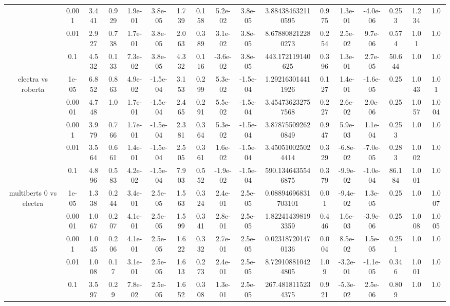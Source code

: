 \begin{tabular}{|c|c|c|c|c|c|c|c|c|c|c|c|c|c|c|c|c|}
 & 0.001 & 3.441 & 0.929 & 1.9e-01 & 3.8e-05 & 1.739 & 0.158 & 5.2e-02 & 3.8e-05 & 3.884384632110595 & 0.975 & 1.3e-01 & -4.0e-06 & 0.253 & 1.234 & 1.0 \\
 & 0.01 & 2.927 & 0.738 & 1.7e-01 & 3.8e-05 & 2.063 & 0.389 & 3.1e-02 & 3.8e-05 & 8.678808212280273 & 0.254 & 2.5e-02 & 9.7e-06 & 0.574 & 1.01 & 1.0 \\
 & 0.1 & 4.532 & 0.133 & 7.3e-02 & 3.8e-05 & 4.332 & 0.116 & -3.6e-02 & 3.8e-05 & 443.172119140625 & 0.396 & 1.3e-01 & 2.7e-05 & 50.644 & 1.0 & 1.0 \\
\hline
\multirow{5}{*}{electra  vs roberta } & 1e-05 & 6.852 & 0.863 & 4.9e-02 & -1.5e-04 & 3.153 & 0.299 & 5.3e-02 & -1.5e-04 & 1.292163014411926 & 0.127 & 1.4e-01 & -1.6e-05 & 0.25 & 1.043 & 1.01 \\
 & 0.0001 & 4.748 & 1.0 & 1.7e-01 & -1.5e-04 & 2.465 & 0.291 & 5.5e-02 & -1.5e-04 & 3.454736232757568 & 0.227 & 2.6e-02 & 2.0e-06 & 0.25 & 1.057 & 1.004 \\
 & 0.001 & 3.979 & 0.766 & 1.7e-01 & -1.5e-04 & 2.381 & 0.364 & 5.3e-02 & -1.5e-04 & 3.878755092620849 & 0.947 & 5.9e-03 & 1.1e-04 & 0.253 & 1.0 & 1.0 \\
 & 0.01 & 3.564 & 0.661 & 1.4e-01 & -1.5e-04 & 2.505 & 0.361 & 1.6e-02 & -1.5e-04 & 3.450510025024414 & 0.329 & -6.8e-02 & -7.0e-05 & 0.283 & 1.002 & 1.0 \\
 & 0.1 & 4.896 & 0.583 & 4.2e-02 & -1.5e-04 & 7.903 & 0.552 & -1.9e-02 & -1.5e-04 & 590.1346435546875 & 0.379 & -9.9e-02 & -1.0e-04 & 86.184 & 1.001 & 1.0 \\
\hline
\multirow{5}{*}{multiberts 0 vs electra } & 1e-05 & 1.338 & 0.244 & 3.4e-01 & 2.5e-05 & 1.563 & 0.324 & 2.4e-01 & 2.5e-05 & 0.08894696831703101 & 0.01 & -9.4e-02 & 1.3e-05 & 0.25 & 1.0 & 1.007 \\
 & 0.0001 & 1.067 & 0.207 & 4.1e-01 & 2.5e-05 & 1.599 & 0.341 & 2.8e-01 & 2.5e-05 & 1.822414398193359 & 0.446 & 1.6e-03 & -3.9e-06 & 0.25 & 1.008 & 1.005 \\
 & 0.001 & 1.045 & 0.206 & 4.1e-01 & 2.5e-05 & 1.622 & 0.332 & 2.7e-01 & 2.5e-05 & 0.023187201470136 & 0.004 & 8.5e-02 & 1.5e-05 & 0.251 & 1.0 & 1.0 \\
 & 0.01 & 1.008 & 0.17 & 3.1e-01 & 2.5e-05 & 1.613 & 0.273 & 2.4e-01 & 2.5e-05 & 8.729108810424805 & 1.09 & -3.2e-01 & -1.1e-05 & 0.346 & 1.001 & 1.0 \\
 & 0.1 & 3.597 & 0.29 & 7.8e-02 & 2.5e-05 & 1.652 & 0.308 & 1.3e-01 & 2.5e-05 & 267.4818115234375 & 0.921 & -5.3e-02 & 2.5e-06 & 0.809 & 1.0 & 1.0 \\

\end{tabular}
